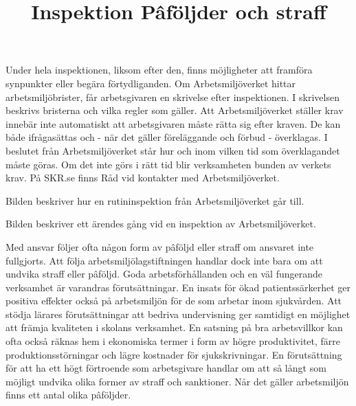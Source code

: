 Under hela inspektionen, liksom efter den, finns möjligheter att framföra synpunkter eller begära förtydliganden. Om Arbetsmiljöverket hittar arbetsmiljöbrister, får arbetsgivaren en skrivelse efter inspektionen. I skrivelsen beskrivs bristerna och vilka regler som gäller. Att Arbetsmiljöverket ställer krav innebär inte automatiskt att arbetsgivaren måste rätta sig efter kraven. De kan både ifrågasättas och - när det gäller föreläggande och förbud - överklagas. I beslutet från Arbetsmiljöverket står hur och inom vilken tid som överklagandet måste göras. Om det inte görs i rätt tid blir verksamheten bunden av verkets krav. På SKR.se finns Råd vid kontakter med Arbetsmiljöverket.

Bilden beskriver hur en rutininspektion från Arbetsmiljöverket går till.

\title{
Inspektion
}

Bilden beskriver ett ärendes gång vid en inspektion av Arbetsmiljöverket.

\title{
Pâföljder och straff
}
Med ansvar följer ofta någon form av pâföljd eller straff om ansvaret inte fullgjorts. Att följa arbetsmiljölagstiftningen handlar dock inte bara om att undvika straff eller pâföljd. Goda arbetsförhållanden och en väl fungerande verksamhet är varandras förutsättningar. En insats för ökad patientssärkerhet ger positiva effekter också på arbetsmiljön för de som arbetar inom sjukvården. Att stödja lärares förutsättningar att bedriva undervisning ger samtidigt en möjlighet att främja kvaliteten i skolans verksamhet. En satsning på bra arbetsvillkor kan ofta också räknas hem i ekonomiska termer i form av högre produktivitet, färre produktionsstörningar och lägre kostnader för sjukskrivningar. En förutsättning för att ha ett högt förtroende som arbetsgivare handlar om att så långt som möjligt undvika olika former av straff och sanktioner. Når det gäller arbetsmiljön finns ett antal olika pâföljder.

